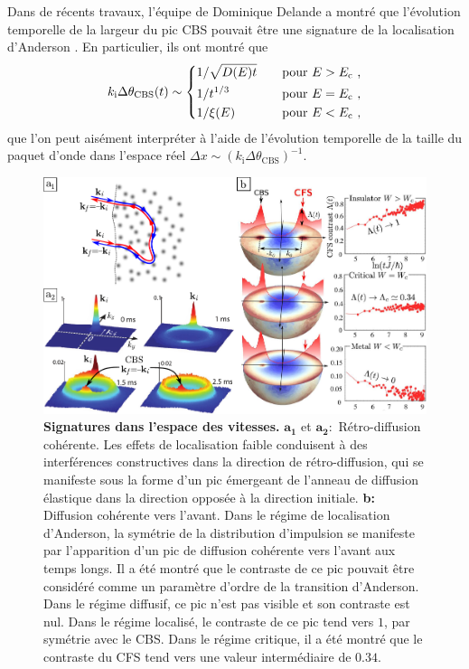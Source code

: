 Dans de récents travaux, l'équipe de Dominique Delande a montré que l'évolution temporelle de la largeur du pic CBS pouvait être une signature de la localisation d'Anderson \citep{ghosh2015coherent}. En particulier, ils ont montré que 
\begin{equation}
k_{\mathrm{i}} \Delta\theta_{\mathrm{CBS}}(t) \sim \left\lbrace \begin{aligned}
& 1/\sqrt{D(E)t}  \quad &&\text{pour } E>E_{\mathrm{c}} \text{ ,}\\
& 1/t^{1/3} \quad &&\text{pour } E=E_{\mathrm{c}} \text{ ,}\\
& 1/\xi(E) \quad &&\text{pour } E<E_{\mathrm{c}} \text{ ,}
\end{aligned}\right.
\label{eq:largeur_cbs}
\end{equation}
que l'on peut aisément interpréter à l'aide de l'évolution temporelle de la taille du paquet d'onde dans l'espace réel $\Delta x\sim (k_{\mathrm{i}} \Delta \theta_{\mathrm{CBS}})^{-1}$.

\begin{figure}
\centering
\includegraphics[width=\textwidth]{Fig/Conclusion/cbs_cfs.pdf}
\caption{\textbf{Signatures dans l'espace des vitesses.} $\mathbf{a_1}$ et $\mathbf{a_2:}$ Rétro-diffusion cohérente. Les effets de localisation faible conduisent à des interférences constructives dans la direction de rétro-diffusion, qui se manifeste sous la forme d'un pic émergeant de l'anneau de diffusion élastique dans la direction opposée à la direction initiale. \textbf{b:} Diffusion cohérente vers l'avant. Dans le régime de localisation d'Anderson, la symétrie de la distribution d'impulsion se manifeste par l'apparition d'un pic de diffusion cohérente vers l'avant aux temps longs. Il a été montré que le contraste de ce pic pouvait être considéré comme un paramètre d'ordre de la transition d'Anderson. Dans le régime diffusif, ce pic n'est pas visible et son contraste est nul. Dans le régime localisé, le contraste de ce pic tend vers $1$, par symétrie avec le CBS. Dans le régime critique, il a été montré que le contraste du CFS tend vers une valeur intermédiaire de $0.34$. }
\label{fig:cbs_cfs}
\end{figure}

